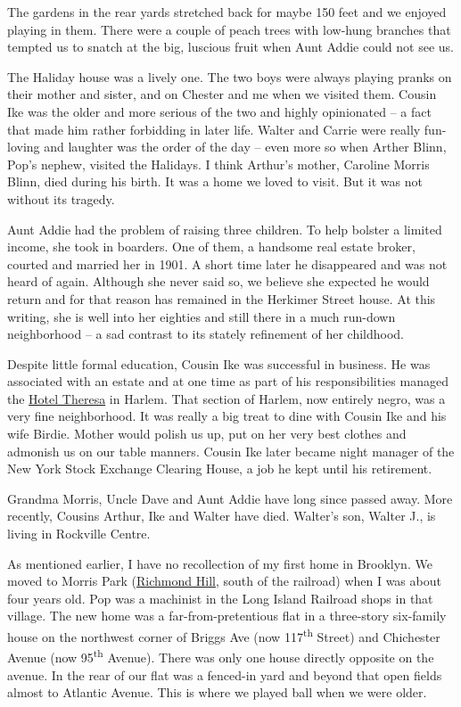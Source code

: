\documentclass[12pt]{book}              %
\begin{document}
The gardens in the rear yards stretched back for maybe 150 feet and we enjoyed playing in them. There were a couple of peach trees with low-hung branches that tempted us to snatch at the big, luscious fruit when Aunt Addie could not see us. 

The Haliday house was a lively one. The two boys were always playing pranks on their mother and sister, and on Chester and me when we visited them. Cousin Ike was the older and more serious of the two and highly opinionated -- a fact that made him rather forbidding in later life. Walter and Carrie were really fun-loving and laughter was the order of the day -- even more so when Arther Blinn, Pop's nephew, visited the Halidays. I think Arthur's mother, Caroline Morris Blinn, died during his birth. It was a home we loved to visit. But it was not without its tragedy. 

Aunt Addie had the problem of raising three children. To help bolster a limited income, she took in boarders. One of them, a handsome real estate broker, courted and married her in 1901. A short time later he disappeared and was not heard of again. Although she never said so, we believe she expected he would return and for that reason has remained in the Herkimer Street house. At this writing, she is well into her eighties and still there in a much run-down neighborhood -- a sad contrast to its stately refinement of her childhood. 

Despite little formal education, Cousin Ike was successful in business. He was associated with an estate and at one time as part of his responsibilities managed the \href{http://en.wikipedia.org/wiki/Hotel_Theresa}{Hotel Theresa} in Harlem. That section of Harlem, now entirely negro, was a very fine neighborhood. It was really a big treat to dine with Cousin Ike and his wife Birdie. Mother would polish us up, put on her very best clothes and admonish us on our table manners. Cousin Ike later became night manager of the New York Stock Exchange Clearing House, a job he kept until his retirement. 

Grandma Morris, Uncle Dave and Aunt Addie have long since passed away. More recently, Cousins Arthur, Ike and Walter have died. Walter's son, Walter J., is living in Rockville Centre. 

As mentioned earlier, I have no recollection of my first home in Brooklyn. We moved to Morris Park (\href{http://en.wikipedia.org/wiki/Richmond_Hill,_Queens}{Richmond Hill}, south of the railroad) when I was about four years old. Pop was a machinist in the Long Island Railroad shops in that village. The new home was a far-from-pretentious flat in a three-story six-family house on the northwest corner of Briggs Ave (now 117\textsuperscript{th} Street) and Chichester Avenue (now 95\textsuperscript{th} Avenue). There was only one house directly opposite on the avenue. In the rear of our flat was a fenced-in yard and beyond that open fields almost to Atlantic Avenue. This is where we played ball when we were older. 
\end{document}
